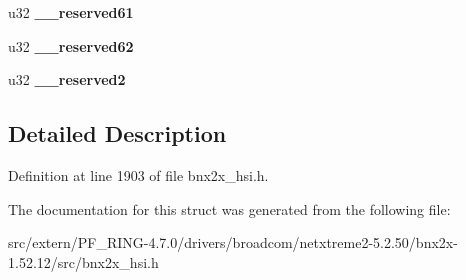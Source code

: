\begin{DoxyCompactItemize}
\item 
\hypertarget{structtstorm__eth__extra__ag__context__section_a1de8d755e98e169f215d581c7e80a30a}{
u32 {\bfseries \_\-\_\-reserved61}}
\label{structtstorm__eth__extra__ag__context__section_a1de8d755e98e169f215d581c7e80a30a}

\item 
\hypertarget{structtstorm__eth__extra__ag__context__section_ab0416cad3bb1da0c9459d1d04c4464b1}{
u32 {\bfseries \_\-\_\-reserved62}}
\label{structtstorm__eth__extra__ag__context__section_ab0416cad3bb1da0c9459d1d04c4464b1}

\item 
\hypertarget{structtstorm__eth__extra__ag__context__section_a8ad4bcdf87d048eb09c62801342c4d4f}{
u32 {\bfseries \_\-\_\-reserved2}}
\label{structtstorm__eth__extra__ag__context__section_a8ad4bcdf87d048eb09c62801342c4d4f}

\end{DoxyCompactItemize}


\subsection{Detailed Description}


Definition at line 1903 of file bnx2x\_\-hsi.h.



The documentation for this struct was generated from the following file:\begin{DoxyCompactItemize}
\item 
src/extern/PF\_\-RING-\/4.7.0/drivers/broadcom/netxtreme2-\/5.2.50/bnx2x-\/1.52.12/src/bnx2x\_\-hsi.h\end{DoxyCompactItemize}
